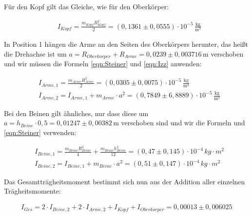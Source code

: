 Für den Kopf gilt das Gleiche, wie für den Oberkörper:

\begin{align*}
  & I_{Kopf} = \frac{m_{Kopf}R_{Kopf}^2}{2} = (0{,}1361 \pm 0{,}0555) \cdot 10^{-5} \, \mathrm{\frac{kg}{m^3}}
\end{align*}

In Position 1 hängen die Arme an den Seiten des Oberkörpers herunter, das heißt die Drehachse ist um $a = R_{Oberk\ddot{o}rper} + R_{Arme} = 0{,}0239 \pm 0{,}003716 \, \mathrm{m}$
verschoben und wir müssen die Formeln \ref{eqn:Steiner} und \ref{eqn:Izz} anwenden:

\begin{align*}
  & I_{Arme,1} = \frac{m_{Arme}R_{Arme}^2}{2} = (0{,}0305 \pm 0{,}0075) \cdot 10^{-5} \, \mathrm{\frac{kg}{m^3}} \\
  & I_{Arme,2} = I_{Arme,1} + m_{Arme} \cdot a^2 = (0{,}7849 \pm 6{,}8889) \cdot 10^{-5} \, \mathrm{\frac{kg}{m^3}}
\end{align*}

Bei den Beinen gilt ähnliches, nur dass diese um $a = h_{Beine} \cdot 0{,}5 = 0{,}01247 \pm 0{,}00382 \, \mathrm{m}$ verschoben sind
und wir die Formeln \label{eqn:Izx} und \ref{eqn:Steiner} verwenden:

\begin{align*}
  & I_{Beine,1} = \frac{m_{Beine}R_{Beine}^2}{4} + \frac{m_{Beine}h_{Beine}^2}{12} = (0,47 \pm 0,145) \cdot 10^{-4} \, kg \cdot m^2 \\
  & I_{Beine,2} = I_{Beine,1} + m_{Beine} \cdot a^2 = (0,51 \pm 0,147) \cdot 10^{-4} \, kg \cdot m^2
\end{align*}

Das Gesamtträgheitsmoment bestimmt sich nun aus der Addition aller einzelnen Trägheitsmomente:

\begin{align}
  I_{Ges} = 2 \cdot I_{Beine,2} + 2 \cdot I_{Arme,2} + I_{Kopf} + I_{Oberk\ddot{o}rper} = 0,00013 \pm 0,006025
\end{align}

